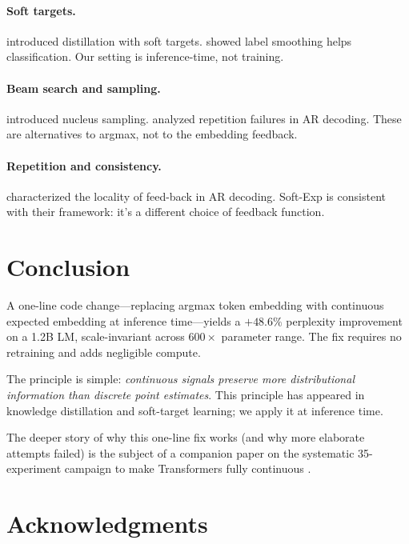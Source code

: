 \documentclass{article}
\begin{document}
\paragraph{Soft targets.}
\citet{hinton2015distill} introduced distillation with soft targets.
\citet{szegedy2016rethinking} showed label smoothing helps classification.
Our setting is inference-time, not training.

\paragraph{Beam search and sampling.}
\citet{holtzman2020curious} introduced nucleus sampling.
\citet{welleck2020neural} analyzed repetition failures in AR decoding.
These are alternatives to argmax, not to the embedding feedback.

\paragraph{Repetition and consistency.}
\citet{xu2022understanding} characterized the locality of feed-back in AR decoding.
Soft-Exp is consistent with their framework: it's a different choice of feedback function.

\section{Conclusion}

A one-line code change---replacing argmax token embedding with continuous expected embedding at inference time---yields a $+48.6\%$ perplexity improvement on a 1.2B LM, scale-invariant across $600\times$ parameter range. The fix requires no retraining and adds negligible compute.

The principle is simple: \emph{continuous signals preserve more distributional information than discrete point estimates}. This principle has appeared in knowledge distillation and soft-target learning; we apply it at inference time.

The deeper story of why this one-line fix works (and why more elaborate attempts failed) is the subject of a companion paper on the systematic 35-experiment campaign to make Transformers fully continuous \citep{wang2026failed}.

\section*{Acknowledgments}
\end{document}
